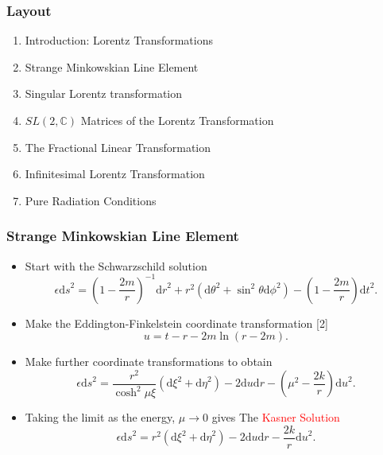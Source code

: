 \documentclass[10pt,a4paper]{beamer}
\begin{document}
\begin{frame}
\frametitle{Layout}
\begin{enumerate}
\item<1>{Introduction: Lorentz Transformations}
\item<1>{Strange Minkowskian Line Element}
\item<0>{Singular Lorentz transformation}
\item<0>{$SL(2,\mathbb{C})$ Matrices of the Lorentz Transformation}
\item<0>{The Fractional Linear Transformation}
\item<0>{Infinitesimal Lorentz Transformation}
\item<0>{Pure Radiation Conditions}
\end{enumerate}
\end{frame}


\begin{frame}
\frametitle{Strange Minkowskian Line Element}
\begin{itemize}
\item<1->{Start with the Schwarzschild solution $$\epsilon {\mathrm{d}s}^2 = {\left(1 - \frac{2m}{r}\right)}^{-1} {\mathrm{d}r}^{2} + r^2 ({\mathrm{d}\theta}^2 + {{\sin}^2 \theta}{\mathrm{d} \phi}^2) - \left(1 - \frac{2m}{r}\right) {\mathrm{d}t}^2.$$}
\item<2->{Make the Eddington-Finkelstein coordinate transformation [2] $$u = t-r - 2m \ln(r-2m).$$}
\item<3->{Make further coordinate transformations to obtain $$\epsilon {\mathrm{d}s}^2 = \frac{r^2}{\cosh^{2}{\mu \xi}} ({\mathrm{d}\xi}^2 + {\mathrm{d}\eta}^2) - 2 {\mathrm{d}u}{\mathrm{d}r} - \left( \mu^{2} - \frac{2k}{r} \right) {\mathrm{d}u}^2.$$}
\item<4->{Taking the limit as the energy, $\mu \rightarrow 0$ gives The \textcolor{red}{Kasner Solution} $$\epsilon {\mathrm{d}s}^2 = r^2 ({\mathrm{d}\xi}^2 + {\mathrm{d}\eta}^2) - 2 {\mathrm{d}u}{\mathrm{d}r} - \frac{2k}{r} {\mathrm{d}u}^2.$$}
\end{itemize}
\end{frame}
\end{document}
